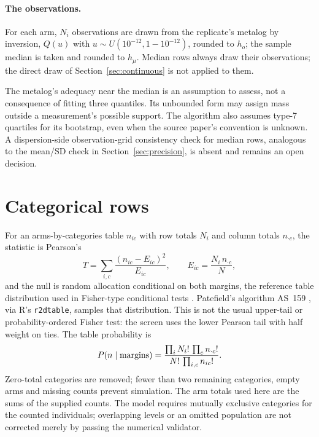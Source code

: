 \documentclass[11pt,a4paper]{article}
\newcommand{\R}{\textsf{R}}
\begin{document}
\paragraph{The observations.} For each arm, $N_i$ observations are drawn from the replicate's metalog by inversion, $Q(u)$ with $u \sim U(10^{-12}, 1 - 10^{-12})$, rounded to $h_o$; the sample median is taken and rounded to $h_\mu$. Median rows always draw their observations; the direct draw of Section~\ref{sec:continuous} is not applied to them.

The metalog's adequacy near the median is an assumption to assess, not a consequence of fitting three quantiles. Its unbounded form may assign mass outside a measurement's possible support. The algorithm also assumes type-7 quartiles for its bootstrap, even when the source paper's convention is unknown. A dispersion-side observation-grid consistency check for median rows, analogous to the mean/SD check in Section~\ref{sec:precision}, is absent and remains an open decision.

\section{Categorical rows}
\label{sec:categorical}

For an arms-by-categories table $n_{ic}$ with row totals $N_i$ and column totals $n_{\cdot c}$, the statistic is Pearson's \citep{pearson1900}
\begin{equation}
T = \sum_{i,c} \frac{(n_{ic} - E_{ic})^2}{E_{ic}}, \qquad E_{ic} = \frac{N_i\, n_{\cdot c}}{N},
\end{equation}
and the null is random allocation conditional on both margins, the reference table distribution used in Fisher-type conditional tests \citep{fisher1935}. Patefield's algorithm AS~159 \citep{patefield1981}, via \R's \texttt{r2dtable}, samples that distribution. This is not the usual upper-tail or probability-ordered Fisher test: the screen uses the lower Pearson tail with half weight on ties. The table probability is
\begin{equation}
P(n\mid\hbox{margins})=\frac{\prod_i N_i!\,\prod_c n_{\cdot c}!}{N!\,\prod_{i,c}n_{ic}!}.
\end{equation}
Zero-total categories are removed; fewer than two remaining categories, empty arms and missing counts prevent simulation. The arm totals used here are the sums of the supplied counts. The model requires mutually exclusive categories for the counted individuals; overlapping levels or an omitted population are not corrected merely by passing the numerical validator.
\end{document}
